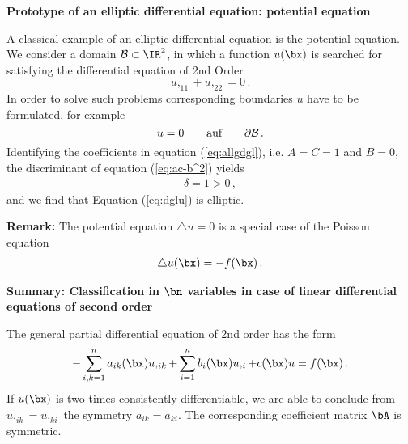 {\bf Prototype of an elliptic differential equation:
potential equation}

A classical example of an elliptic differential equation
is the potential equation.
We consider a domain ${\cal B} \subset \IR^2$, in which
a function $u(\bx) $ is searched for satisfying the 
differential equation of 2nd Order 
%
\begin{equation}
u,_{11} + u,_{22} = 0 \, . 
\label{eq:dglu}
\end{equation}
%
In order to solve such problems corresponding boundaries 
$u$ have to be formulated, for example 
%
\begin{equation}
u =  0 \qquad \mbox{auf} \qquad \partial {\cal B} \, .
\end{equation}
%
Identifying the coefficients in equation 
(\ref{eq:allgdgl}), i.e. $A=C=1$ and $B=0$, 
the discriminant of equation (\ref{eq:ac-b^2}) yields 
%
\begin{eqnarray}
\delta=1>0 \, ,
\end{eqnarray}
%
and we find that Equation (\ref{eq:dglu}) is elliptic. 

{\bf Remark:} The potential equation $\triangle u = 0$ is 
a special case of the Poisson equation 
%
\begin{eqnarray}
\triangle u (\bx ) = - f(\bx) \, .
\end{eqnarray}
%

{\bf Summary: Classification in $\bn$ variables in case of 
linear differential equations of second order}

The general partial differential equation of 2nd order 
has the form 
%
\begin{equation}
- \sum_{i,k=1}^n a_{ik} (\bx) u,_{ik} + \sum_{i=1}^n b_i (\bx) u,_i +
c(\bx) u = f(\bx) \, .
\label{eq:dgltyp}
\end{equation}
%
If $u(\bx)$ is two times consistently differentiable, we 
are able to conclude from $u,_{ik}=u,_{ki}$ the symmetry 
$a_{ik}=a_{ki}$. 
The corresponding coefficient matrix $\bA$ is symmetric. 

